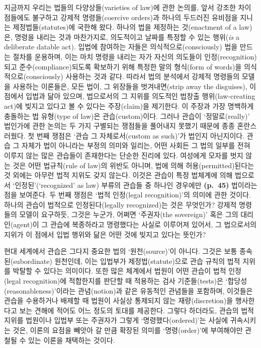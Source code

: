 지금까지 우리는 법들의 다양상들(varieties of law)에 관한 논의를, 앞서
강조한 차이점들에도 불구하고 강제적 명령들(coercive orders)과 하나의
두드러진 유비점을 지니는 제정법들(statutes)에 국한해 왔다. 하나의 법을
제정하는 것(enactment of a law)은, 명령을 내리는 것과 마찬가지로,
의도적이고 날짜를 특정할 수 있는 행위(\emph{is} a deliberate
datable act). 입법에 참여하는 자들은 의식적으로(consciously) 법을 만드는
절차를 운용하며, 이는 마치 명령을 내리는 자가 자신의 의도들이
인정(recognition)되고 준수(compliance)되도록 확보하기 위해 특정한 말의
형식(form of words)을 의식적으로(consciously) 사용하는 것과 같다. 따라서
법의 분석에서 강제적 명령들의 모델을 사용하는 이론들은, 모든 법이, 그
위장들을 벗겨내면(strip away the disguises), 이 점에서 입법과 닮아
있으며, 법으로서의 그 지위를 의도적인 법창출 행위(law-creating act)에
빚지고 있다고 볼 수 있다는 주장(claim)을 제기한다. 이 주장과 가장
명백하게 충돌하는 법 유형(type of law)은 관습(custom)이다. 그러나 관습이
‘정말로(really)’ 법인가에 관한 논의는 두 가지 구별되는 쟁점들을 풀어내지
못했기 때문에 종종 혼란스러웠다. 첫 번째 쟁점은 ‘관습 그 자체로서(custom
as such)’가 법인지 아닌지이다. 관습 그 자체가 법이 아니라는 부정의
의미와 일리는, 어떤 사회든 그 법의 일부를 전혀 이루지 않는 많은 관습들이
존재한다는 단순한 진리에 있다. 여성에게 모자를 벗지 않는 것은 어떤
법규칙(rule of law)의 위반도 아니며, 법에 의해 허용(permitted)된다는 것
외에는 아무런 법적 지위도 갖지 않는다. 이것은 관습이 특정 법체계에 의해
법으로서 ‘인정된’(`recognized' as law) 부류의 관습들 중 하나인 경우에만
\textbf{(p.~45)} 법이라는 점을 보여준다. 두 번째 쟁점은 ‘법적 인정(legal
recognition)’의 의미에 관한 것이다. 하나의 관습이 법적으로
인정된다(legally recognized)는 것은 무엇인가? 강제적 명령들의 모델이
요구하듯, 그것은 누군가, 어쩌면 ‘주권자(the sovereign)’ 혹은 그의
대리인(agent)이 그 관습에 복종하라고 명령했다는 사실로 이루어져 있어서,
그 법으로서의 지위가 이 점에서 입법 행위와 닮은 어떤 것에 빚지고 있다는
뜻인가?

현대 세계에서 관습은 그다지 중요한 법의 ‘원천(source)’이 아니다. 그것은
보통 종속된(subordinate) 원천인데, 이는 입법부가 제정법(statute)으로
관습 규칙의 법적 지위를 박탈할 수 있다는 의미이다. 또한 많은 체계에서
법원이 어떤 관습이 법적 인정(legal recognition)에 적합한지를 판단할 때
적용하는 검사 기준들(tests)은 ‘합당성(reasonableness)’이라는
관념(notion)과 같은 유동적인 관념들을 포함하며, 이것들은 관습을
수용하거나 배제할 때 법원이 사실상 통제되지 않는 재량(discretion)을
행사한다고 보는 견해에 적어도 어느 정도의 토대를 제공한다. 그렇다
하더라도, 관습의 법적 지위를 법원이나 입법부 또는 주권자가 그렇게
‘명령했다(ordered)’는 사실에 귀속시키는 것은, 이론의 요점을 빼앗아 갈
만큼 확장된 의미를 ‘명령(order)’에 부여해야만 관철될 수 있는 이론을
채택하는 것이다.

